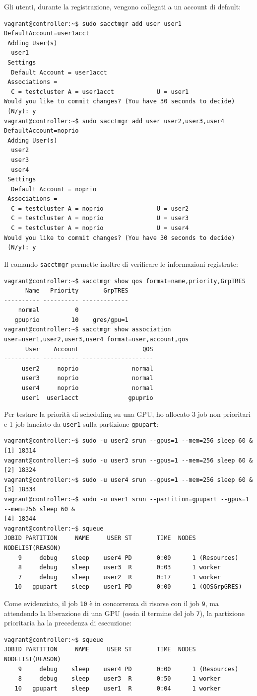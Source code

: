 \documentclass[12pt,a4paper,twoside,openright]{book}
\begin{document}
Gli utenti, durante la registrazione, vengono collegati a un account di default:
\begin{verbatim}
vagrant@controller:~$ sudo sacctmgr add user user1 DefaultAccount=user1acct
 Adding User(s)
  user1
 Settings
  Default Account = user1acct
 Associations =
  C = testcluster A = user1acct            U = user1
Would you like to commit changes? (You have 30 seconds to decide)
 (N/y): y
vagrant@controller:~$ sudo sacctmgr add user user2,user3,user4 DefaultAccount=noprio
 Adding User(s)
  user2
  user3
  user4
 Settings
  Default Account = noprio
 Associations =
  C = testcluster A = noprio               U = user2
  C = testcluster A = noprio               U = user3
  C = testcluster A = noprio               U = user4
Would you like to commit changes? (You have 30 seconds to decide)
 (N/y): y
\end{verbatim}
Il comando \texttt{sacctmgr} permette inoltre di verificare le informazioni registrate:
\begin{verbatim}
vagrant@controller:~$ sacctmgr show qos format=name,priority,GrpTRES
      Name   Priority       GrpTRES
---------- ---------- -------------
    normal          0              
   gpuprio         10    gres/gpu=1
vagrant@controller:~$ sacctmgr show association user=user1,user2,user3,user4 format=user,account,qos
      User    Account                  QOS
---------- ---------- --------------------
     user2     noprio               normal
     user3     noprio               normal
     user4     noprio               normal
     user1  user1acct              gpuprio
\end{verbatim}
Per testare la priorità di scheduling su una \ac{GPU}, ho allocato 3 job non prioritari e 1 job lanciato da \texttt{user1} sulla partizione \texttt{gpupart}:
\begin{verbatim}
vagrant@controller:~$ sudo -u user2 srun --gpus=1 --mem=256 sleep 60 &
[1] 18314
vagrant@controller:~$ sudo -u user3 srun --gpus=1 --mem=256 sleep 60 &
[2] 18324
vagrant@controller:~$ sudo -u user4 srun --gpus=1 --mem=256 sleep 60 &
[3] 18334
vagrant@controller:~$ sudo -u user1 srun --partition=gpupart --gpus=1 --mem=256 sleep 60 &
[4] 18344
vagrant@controller:~$ squeue
JOBID PARTITION     NAME     USER ST       TIME  NODES NODELIST(REASON)
    9     debug    sleep    user4 PD       0:00      1 (Resources)
    8     debug    sleep    user3  R       0:03      1 worker
    7     debug    sleep    user2  R       0:17      1 worker
   10   gpupart    sleep    user1 PD       0:00      1 (QOSGrpGRES)
\end{verbatim}
Come evidenziato, il job \texttt{10} è in concorrenza di risorse con il job \texttt{9}, ma attendendo la liberazione di una \ac{GPU} (ossia il termine del job \texttt{7}), la partizione prioritaria ha la precedenza di esecuzione:
\begin{verbatim}
vagrant@controller:~$ squeue
JOBID PARTITION     NAME     USER ST       TIME  NODES NODELIST(REASON)
    9     debug    sleep    user4 PD       0:00      1 (Resources)
    8     debug    sleep    user3  R       0:50      1 worker
   10   gpupart    sleep    user1  R       0:04      1 worker
\end{verbatim}
\end{document}

